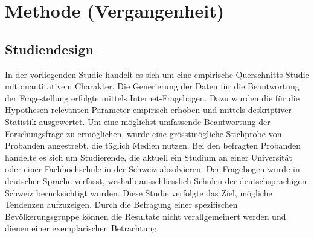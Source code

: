 %
%
\glsresetall
\chapter{Methode (Vergangenheit)}

\section{Studiendesign}\label{section.studiendesign}
In der vorliegenden Studie handelt es sich um eine empirische Querschnitts-Studie mit quantitativem Charakter. Die Generierung der Daten für die Beantwortung der Fragestellung erfolgte mittels Internet-Fragebogen. Dazu wurden die für die Hypothesen relevanten Parameter empirisch erhoben und mittels deskriptiver Statistik ausgewertet. Um eine möglichst umfassende Beantwortung der Forschungsfrage zu ermöglichen, wurde eine grösstmögliche Stichprobe von Probanden angestrebt, die täglich Medien nutzen. Bei den befragten Probanden handelte es sich um Studierende, die aktuell ein Studium an einer Universität oder einer Fachhochschule in der Schweiz absolvieren. Der Fragebogen wurde in deutscher Sprache verfasst, weshalb ausschliesslich Schulen der deutschsprachigen Schweiz berücksichtigt wurden. Diese Studie verfolgte das Ziel, mögliche Tendenzen aufzuzeigen. Durch die Befragung einer spezifischen Bevölkerungsgruppe können die Resultate nicht verallgemeinert werden und dienen einer exemplarischen Betrachtung.

